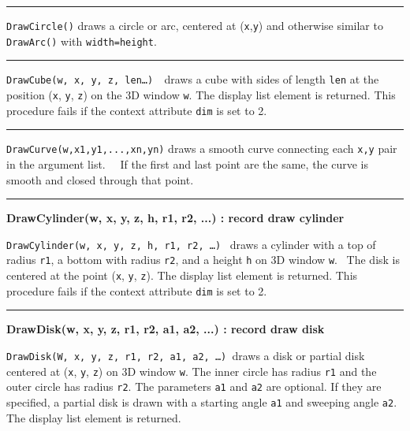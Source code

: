 \bigskip\hrule\vspace{0.1cm}

\noindent
\texttt{DrawCircle()} draws a circle or arc, centered at
(\texttt{x},\texttt{y}) and otherwise similar to \texttt{DrawArc()}
with \texttt{width=height}.

\bigskip\hrule\vspace{0.1cm}

\noindent
\texttt{DrawCube(w, x, y, z, len{\dots}) \ }draws a cube with sides of
length \texttt{len} at the position (\texttt{x}, \texttt{y},
\texttt{z}) on the 3D window \texttt{w}. The display list element is
returned. This procedure fails if the context attribute \texttt{dim} is
set to 2. 

\bigskip\hrule\vspace{0.1cm}

\noindent
\texttt{DrawCurve(w,x1,y1,...,xn,yn)} draws a smooth curve connecting
each \texttt{x,y} pair in the argument list. \ \ If the first and last
point are the same, the curve is smooth and closed through that point.

\bigskip\hrule\vspace{0.1cm}
\noindent
{\bf DrawCylinder(w, x, y, z, h, r1, r2, ...) : record \hfill draw cylinder}

\noindent
\texttt{DrawCylinder(w, x, y, z, h, r1, r2, {\dots})} \ draws a cylinder
with a top of radius \texttt{r1}, a bottom with radius \texttt{r2}, and
a height \texttt{h} on 3D window \texttt{w}. \ The disk is centered at
the point (\texttt{x}, \texttt{y}, \texttt{z}). The display list
element is returned. This procedure fails if the context attribute
\texttt{dim} is set to 2.

\bigskip\hrule\vspace{0.1cm}
\noindent
{\bf DrawDisk(w, x, y, z, r1, r2, a1, a2, ...) : record \hfill draw disk}

\noindent
\texttt{DrawDisk(W, x, y, z, r1, r2, a1, a2, {\dots})}\texttt{ }draws a
disk or partial disk centered at (\texttt{x}, \texttt{y}, \texttt{z})
on 3D window \texttt{w}. The inner circle has radius \texttt{r1} and
the outer circle has radius \texttt{r2}. The parameters \texttt{a1} and
\texttt{a2} are optional. If they are specified, a partial disk is
drawn with a starting angle \texttt{a1} and sweeping angle \texttt{a2}.
The display list element is returned.

